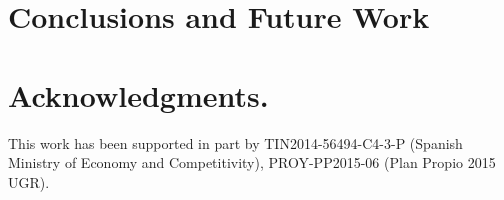 \documentclass[a4paper,10pt,twocolumn,preprint,3p]{elsarticle}
\begin{document}

\section{Conclusions and Future Work}
\label{sec:future}

\section*{Acknowledgments.}

This work has been supported in part by TIN2014-56494-C4-3-P (Spanish
Ministry of Economy and Competitivity), PROY-PP2015-06 (Plan Propio
2015 UGR).



\end{document}
